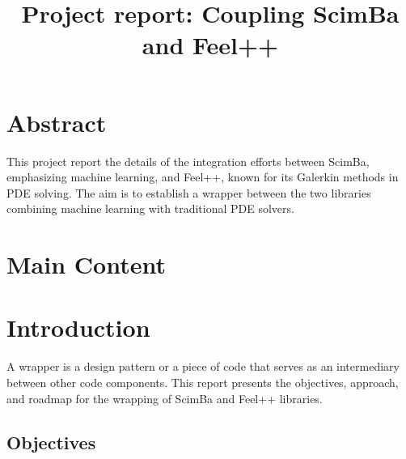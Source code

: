 \documentclass[12pt]{article}
\begin{document}
\title{Project report: Coupling ScimBa and Feel++}

\submitdate{\today}
\maketitle

\addtocounter{page}{-1}
\thispagestyle{empty}


\newpage
\doublespacing
\tableofcontents
\singlespacing

\newpage
\section*{Abstract}\label{Conventions}
\begin{frame}
    This project report the details of the integration efforts between ScimBa, emphasizing machine learning, and Feel++, known for its Galerkin methods in PDE solving. The aim is to establish a wrapper between the two libraries combining machine learning with traditional PDE solvers.
    
\end{frame}
\vspace{2em}


\newpage
{}
\section*{Main Content}

\section{Introduction} \label{Sec: Introduction}

A wrapper is a design pattern or a piece of code that serves as an intermediary between other code components. This report presents the objectives, approach, and roadmap for the wrapping of ScimBa and Feel++ libraries. 


\subsection{Objectives}
\end{document}
